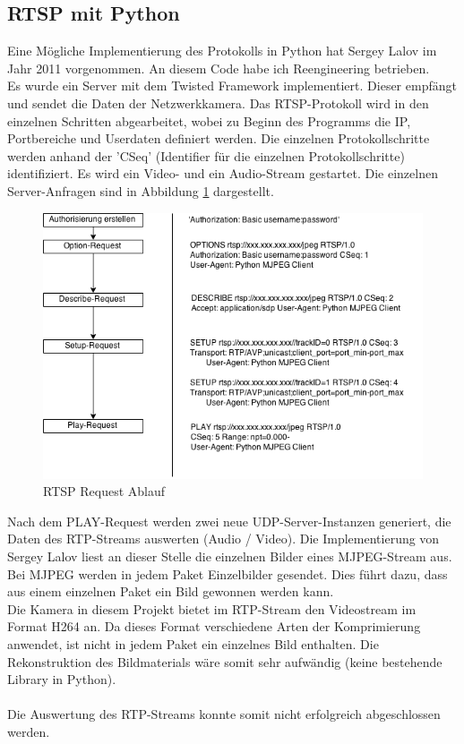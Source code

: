 \subsection{RTSP mit Python}
Eine Mögliche Implementierung des Protokolls in Python hat Sergey Lalov im Jahr 2011 vorgenommen\cite{rtsppython}. An diesem Code habe ich Reengineering betrieben. \\
Es wurde ein Server mit dem Twisted Framework implementiert. Dieser empfängt und sendet die Daten der Netzwerkkamera. Das RTSP-Protokoll wird in den einzelnen Schritten abgearbeitet, wobei zu Beginn des Programms die IP, Portbereiche und Userdaten definiert werden. Die einzelnen Protokollschritte werden anhand der 'CSeq' (Identifier für die einzelnen Protokollschritte) identifiziert. Es wird ein Video- und ein Audio-Stream gestartet. Die einzelnen Server-Anfragen sind in Abbildung \ref{fig:rtsprequest} dargestellt.

\begin{figure}[h]
\begin{minipage}{\textwidth}
	\centering
	\includegraphics[width=\textwidth]{./data/RTSP.png}
	\caption{\label{fig:rtsprequest}RTSP Request Ablauf}
\end{minipage}
\end{figure}
\pagebreak

Nach dem PLAY-Request werden zwei neue UDP-Server-Instanzen generiert, die Daten des RTP-Streams auswerten (Audio / Video). Die Implementierung von Sergey Lalov liest an dieser Stelle die einzelnen Bilder eines MJPEG-Stream aus. Bei MJPEG werden in jedem Paket Einzelbilder gesendet\cite{mjpeg}. Dies führt dazu, dass aus einem einzelnen Paket ein Bild gewonnen werden kann.  \\
Die Kamera in diesem Projekt bietet im RTP-Stream den Videostream im Format H264\cite{h264} an. Da dieses Format verschiedene Arten der Komprimierung anwendet, ist nicht in jedem Paket ein einzelnes Bild enthalten. Die Rekonstruktion des Bildmaterials wäre somit sehr aufwändig (keine bestehende Library in Python). \\\\
Die Auswertung des RTP-Streams konnte somit nicht erfolgreich abgeschlossen werden.  


